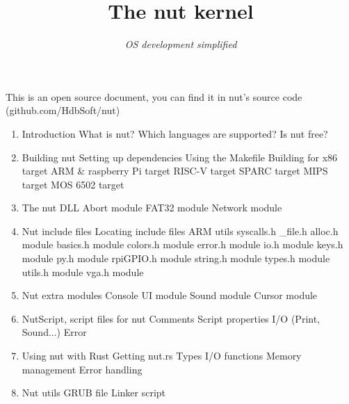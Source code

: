 \documentclass{article}
\title{The nut kernel}
\author{\textit{OS development simplified}}
\date{}
\begin{document}
  \maketitle
  \newpage
  \begin{center}
    This is an open source document, you can find it in nut's source code (github.com/HdbSoft/nut)
  \end{center}
  \newpage

  \begin{enumerate}
  	\Large \item Introduction
    \large \subitem What is nut?
    \large \subitem Which languages are supported?
    \large \subitem Is nut free?
  	\\
  	\Large \item Building nut
    \large \subitem Setting up dependencies
    \large \subitem Using the Makefile
  	\large \subitem Building for x86 target
  	\large \subitem ARM \& raspberry Pi target
  	\large \subitem RISC-V target
  	\large \subitem SPARC target
  	\large \subitem MIPS target
  	\large \subitem MOS 6502 target
    \\
  	\Large \item The nut DLL
  	\large \subitem Abort module
    \large \subitem FAT32 module
    \large \subitem Network module
    \\
  	\Large \item Nut include files
    \large \subitem Locating include files
    \large \subitem ARM utils
    \normalsize \subitem \hspace{1cm} syscalls.h
    \normalsize \subitem \hspace{1cm} \_file.h
    \large \subitem alloc.h module
    \large \subitem basics.h module
    \large \subitem colors.h module
    \large \subitem error.h module
    \large \subitem io.h module
    \large \subitem keys.h module
    \large \subitem py.h module
    \large \subitem rpiGPIO.h module
    \large \subitem string.h module
    \large \subitem types.h module
    \large \subitem utils.h module
    \large \subitem vga.h module
    \\
    \Large \item Nut extra modules
    \large \subitem Console UI module
    \large \subitem Sound module
    \large \subitem Cursor module
    \\
  	\Large \item NutScript, script files for nut
  	\large \subitem Comments
    \large \subitem Script properties
    \large \subitem I/O (Print, Sound...)
    \large \subitem Error
    \\
    \Large \item Using nut with Rust
    \large \subitem Getting nut.rs
    \large \subitem Types
    \large \subitem I/O functions
    \large \subitem Memory management
    \large \subitem Error handling
    \\
    \Large \item Nut utils
    \large \subitem GRUB file
    \large \subitem Linker script
  \end{enumerate}
  \newpage
\end{document}
